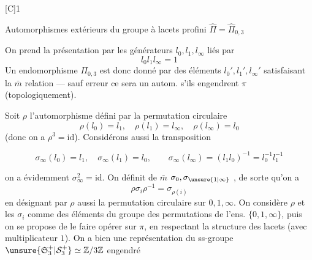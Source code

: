 [C]\qquad\textcircled{1}\qquad{}

Automorphismes extérieurs du groupe à lacets  profini $\hat\Pi=\hat\Pi_{0,3}$
\margin{$\unsure{\partial|\delta}$}

On prend la présentation par les générateurs $l_0,l_1,l_\infty$ liés par
\[
l_0l_1l_\infty=1
\]
Un endomorphisme  $\Pi_{0,3}$ est donc donné par des éléments $l_0',l_1',l_\infty'$ satisfaisant la $\bar m$ relation --- sauf erreur ce sera un autom. s'ils engendrent $\pi$ (topologiquement).

Soit $\rho$ l'automorphisme défini par la permutation circulaire
\[
\rho(l_0)=l_1,\quad\rho(l_1)=l_\infty,\quad\rho(l_\infty)=l_0
\]
(donc on a $\rho^3=\mathrm{id}$). Considérons aussi la transposition

\[
\sigma_\infty(l_0)=l_1,\quad\sigma_\infty(l_1)=l_0,\qquad
\sigma_\infty(l_\infty)=(l_1l_0)^{-1}=l_0^{-1}l_1^{-1}
\]

on a évidemment $\sigma_\infty^2=\mathrm{id}$. On définit de $\bar m$ $\sigma_0,\sigma_{\unsure{1|\infty}}$ , de sorte qu'on a
\[
\rho\sigma_i\rho^{-1}=\sigma_{\rho(i)}
\]
en désignant par $\rho$ aussi la permutation circulaire sur $0,1,\infty$. On considère $\rho$ et les $\sigma_i$ comme des éléments du groupe  des permutations de l'ens. $\{0,1,\infty\}$, puis on se propose de le faire opérer sur $\pi$, en respectant la structure des lacets (avec  multiplicateur $1$). On a bien une  représentation du ss-groupe $\unsure{\mathfrak S_3^+|\mathcal S_3^+}\simeq\mathbb Z/3\mathbb Z$ engendré
